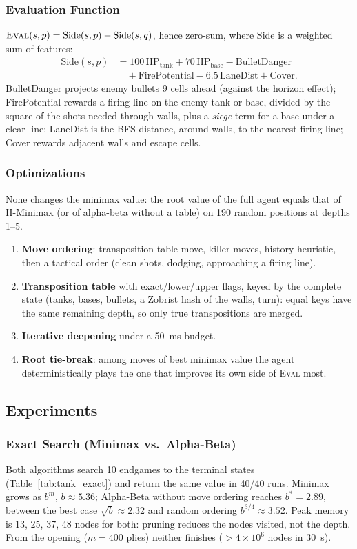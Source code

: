 \documentclass[conference]{IEEEtran}
\begin{document}
\subsubsection{Evaluation Function}
$\textsc{Eval}(s,p)=\text{Side}(s,p)-\text{Side}(s,q)$, hence zero-sum, where Side is a weighted sum of features:
\begin{align}
\text{Side}(s,p) &= 100\,\text{HP}_{\text{tank}}+70\,\text{HP}_{\text{base}}-\text{BulletDanger} \nonumber\\
 &\quad +\text{FirePotential}-6.5\,\text{LaneDist}+\text{Cover}.
\end{align}
BulletDanger projects enemy bullets 9 cells ahead (against the horizon effect); FirePotential rewards a firing line on the enemy tank or base, divided by the square of the shots needed through walls, plus a \emph{siege} term for a base under a clear line; LaneDist is the BFS distance, around walls, to the nearest firing line; Cover rewards adjacent walls and escape cells.

\subsubsection{Optimizations}
None changes the minimax value: the root value of the full agent equals that of H-Minimax (or of alpha-beta without a table) on 190 random positions at depths 1--5.
\begin{enumerate}
    \item \textbf{Move ordering}: transposition-table move, killer moves, history heuristic, then a tactical order (clean shots, dodging, approaching a firing line).
    \item \textbf{Transposition table} with exact/lower/upper flags, keyed by the complete state (tanks, bases, bullets, a Zobrist hash of the walls, turn): equal keys have the same remaining depth, so only true transpositions are merged.
    \item \textbf{Iterative deepening} under a 50~ms budget.
    \item \textbf{Root tie-break}: among moves of best minimax value the agent deterministically plays the one that improves its own side of \textsc{Eval} most.
\end{enumerate}

\subsection{Experiments}
\subsubsection{Exact Search (Minimax vs.\ Alpha-Beta)}
Both algorithms search 10 endgames to the terminal states (Table~\ref{tab:tank_exact}) and return the same value in 40/40 runs. Minimax grows as $b^m$, $b\approx 5.36$; Alpha-Beta without move ordering reaches $b^*=2.89$, between the best case $\sqrt{b}\approx 2.32$ and random ordering $b^{3/4}\approx 3.52$. Peak memory is 13, 25, 37, 48 nodes for both: pruning reduces the nodes visited, not the depth. From the opening ($m=400$ plies) neither finishes ($>4\times 10^6$ nodes in 30~s).
\end{document}

